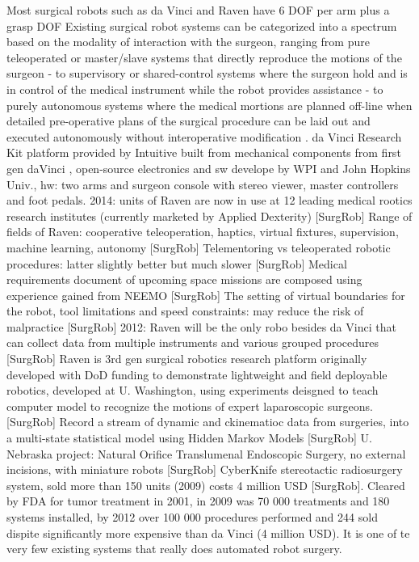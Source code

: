 Most surgical robots such as da Vinci and Raven have 6 DOF per arm plus a grasp DOF \citep{bib:raven_debride}
Existing surgical robot systems can be categorized into a spectrum based on the modality of interaction with the surgeon, ranging from pure teleoperated or master/slave systems that directly reproduce the motions of the surgeon - to supervisory or shared-control systems where the surgeon hold and is in control of the medical instrument while the robot provides assistance - to purely autonomous systems where the medical mortions are planned off-line when detailed pre-operative plans of the surgical procedure can be laid out and executed autonomously without interoperative modification \citep{bib:raven_debride}.
da Vinci Research Kit platform provided by Intuitive built from mechanical components from first gen daVinci \citep{bib:raven_observ}, open-source electronics and sw develope by WPI and John Hopkins Univ., hw: two arms and surgeon console with stereo viewer, master controllers and foot pedals.
2014: units of Raven are now in use at 12 leading medical rootics research institutes (currently marketed by Applied Dexterity) [SurgRob]
Range of fields of Raven: cooperative teleoperation, haptics, virtual fixtures, supervision, machine learning, autonomy [SurgRob]
Telementoring vs teleoperated robotic procedures: latter slightly better but much slower [SurgRob]
Medical requirements document of upcoming space missions are composed using experience gained from NEEMO [SurgRob]
The setting of virtual boundaries for the robot, tool limitations and speed constraints: may reduce the risk of malpractice [SurgRob]
2012: Raven will be the only robo besides da Vinci that can collect data from multiple instruments and various grouped procedures [SurgRob]
Raven is 3rd gen surgical robotics research platform originally developed with DoD funding to demonstrate lightweight and field deployable robotics, developed at U. Washington, using experiments deisgned to teach  computer model to recognize the motions of expert laparoscopic surgeons. [SurgRob] Record a stream of dynamic and ckinematioc data from surgeries, into a multi-state statistical model using Hidden Markov Models [SurgRob]
U. Nebraska project: Natural Orifice Translumenal Endoscopic Surgery, no external incisions, with miniature robots [SurgRob]
CyberKnife stereotactic radiosurgery system, sold more than 150 units (2009) costs 4 million USD [SurgRob]. Cleared by FDA for tumor treatment in 2001, in 2009 was 70 000 treatments and 180 systems installed, by 2012 over 100 000 procedures performed and 244 sold dispite significantly more expensive than da Vinci (4 million USD). It is one of te very few existing systems that really does automated robot surgery.
